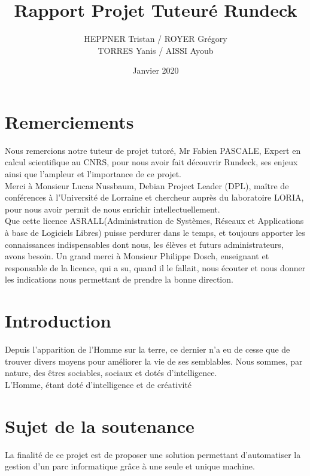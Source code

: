 \documentclass[12pt]{article}
\title{Rapport Projet Tuteuré Rundeck}
\author{HEPPNER Tristan / ROYER Grégory
\\
TORRES Yanis / AISSI Ayoub }
\date{Janvier 2020}
\begin{document}
\maketitle
\newpage
\tableofcontents
\newpage
\section{Remerciements}

Nous remercions notre tuteur de projet tutoré, Mr Fabien PASCALE, Expert en calcul scientifique au CNRS, pour nous avoir fait découvrir Rundeck, ses enjeux ainsi que l'ampleur et l'importance de ce projet.
\vspace{0.5cm}
\\
Merci  à  Monsieur Lucas  Nussbaum,  Debian  Project  Leader  (DPL),  maître  de conférences à l'Université de Lorraine et chercheur auprès du laboratoire LORIA, pour nous avoir permit de nous enrichir intellectuellement.
\vspace{0.5cm}
\\
Que cette licence ASRALL(Administration de Systèmes, Réseaux et Applications à base  de  Logiciels  Libres)  puisse  perdurer  dans  le  temps,  et  toujours  apporter  les connaissances indispensables dont nous, les élèves et futurs administrateurs, avons besoin. Un grand merci à Monsieur Philippe Dosch, enseignant et responsable de la licence, qui a su, quand il le fallait, nous écouter et nous donner les indications nous permettant de prendre la bonne direction.
\newpage
\section{Introduction}
Depuis l’apparition de l’Homme sur la terre, ce dernier n’a eu de cesse que de trouver divers moyens pour améliorer la vie de ses semblables. Nous sommes,  par  nature, des  êtres sociables, sociaux et dotés d’intelligence. 
\\
L'Homme, étant doté d'intelligence et de créativité 

\section{Sujet de la soutenance}

La finalité de ce projet est de proposer une solution permettant d'automatiser la gestion d'un parc informatique grâce à une seule et unique machine.
\end{document}
